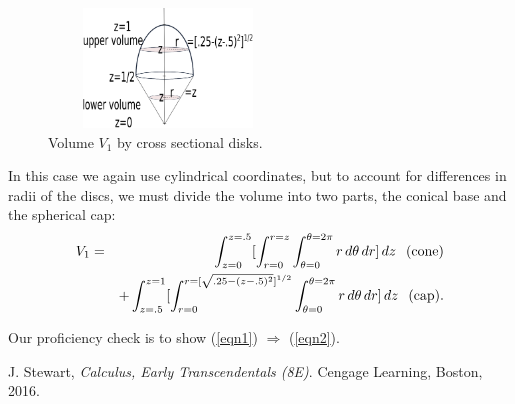 \documentclass[12pt,fleqn]{article}
\begin{document}
\begin{figure}[h]
    \centering
        \includegraphics [width=2.5in, height=1.25in]{ic4.eps}
    \caption{Volume $V_1$ by cross sectional disks.}
    \label{ic4}
\end{figure}

{\flushleft In} this case we again use cylindrical coordinates, but to account for differences in radii of the discs, we must divide the volume into two parts, the conical base  and the spherical cap:
\begin{eqnarray}
V_1 & = & \int_{z=0}^{z=.5}[\int_{r=0}^{r=z}\int_{\theta=0}^{\theta=2\pi} r\,d\theta\,dr]\,dz \hspace{.1in} \textup{(cone)}\nonumber\\
&& + \int_{z=.5}^{z=1}[\int_{r=0}^{r=[\sqrt{.25-(z-.5)^2}]^{1/2}}\int_{\theta=0}^{\theta=2\pi} r\,d\theta\,dr]\,dz \hspace{.1in} \textup{(cap)}.\label{eqn2}
\end{eqnarray}


{\flushleft Our} proficiency check is to show (\ref{eqn1}) $\Rightarrow$ (\ref{eqn2}). 





\begin{thebibliography}{5}

 J. Stewart,  \emph{Calculus, Early Transcendentals (8E)}. Cengage Learning, Boston, 2016.

\end{thebibliography}
\end{document}
